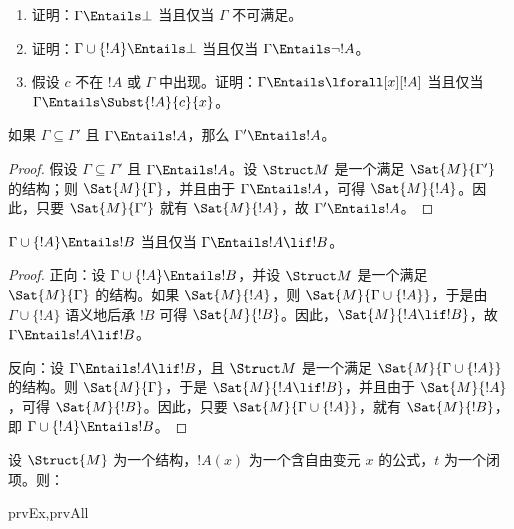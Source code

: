 \documentclass[../../../include/open-logic-section]{subfiles}
\begin{document}
\begin{prob}
\begin{enumerate}
\item 证明：$\Gamma \Entails \bot$ 当且仅当 $\Gamma$ 不可满足。
\item 证明：$\Gamma \cup \{!A\} \Entails \bot$ 当且仅当 $\Gamma \Entails \lnot !A$。
\item 假设 $c$ 不在 $!A$ 或 $\Gamma$ 中出现。证明：$\Gamma \Entails \lforall[x][!A]$ 当且仅当 $\Gamma \Entails
  \Subst{!A}{c}{x}$。
\end{enumerate}
\end{prob}

\begin{prop}
如果 $\Gamma \subseteq \Gamma'$ 且 $\Gamma \Entails !A$，那么 $\Gamma' \Entails !A$。
\end{prop}

\begin{proof}
假设 $\Gamma \subseteq \Gamma'$ 且 $\Gamma \Entails !A$。设 $\Struct M$ 是一个满足 $\Sat{M}{\Gamma'}$ 的结构；则 $\Sat{M}{\Gamma}$，并且由于 $\Gamma \Entails !A$，可得 $\Sat{M}{!A}$。因此，只要 $\Sat{M}{\Gamma'}$ 就有 $\Sat{M}{!A}$，故 $\Gamma' \Entails !A$。
\end{proof}

\begin{thm}[语义演绎定理]
$\Gamma \cup \{!A\} \Entails !B$ 当且仅当 $\Gamma \Entails !A \lif !B$。
\end{thm}

\begin{proof}
正向：设 $\Gamma \cup \{ !A \} \Entails !B$，并设 $\Struct M$ 是一个满足 $\Sat{M}{\Gamma}$ 的结构。如果 $\Sat{M}{!A}$，则 $\Sat{M}{\Gamma \cup \{ !A \} }$，于是由 $\Gamma \cup \{ !A \}$ 语义地后承 $!B$ 可得 $\Sat{M}{!B}$。因此，$\Sat{M}{!A \lif !B}$，故 $\Gamma \Entails !A \lif !B$。

反向：设 $\Gamma \Entails !A \lif !B$，且 $\Struct M$ 是一个满足 $\Sat{M}{\Gamma \cup \{ !A
  \}}$ 的结构。则 $\Sat{M}{\Gamma}$，于是 $\Sat{M}{!A \lif !B}$，并且由于 $\Sat{M}{!A}$，可得 $\Sat{M}{!B}$。因此，只要 $\Sat{M}{\Gamma \cup \{
  !A \} }$，就有 $\Sat{M}{!B}$，即 $\Gamma \cup \{ !A \} \Entails !B$。
\end{proof}

\begin{prop}
  设 $\Struct{M}$ 为一个结构，$!A(x)$ 为一个含自由变元 $x$ 的公式，$t$ 为一个闭项。则：
  \begin{tagenumerate}{prvEx,prvAll}
  \end{tagenumerate}
\end{prop}
\end{document}
